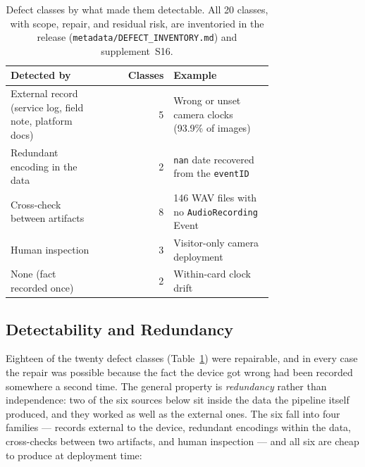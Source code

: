 \documentclass[sigconf]{acmart}
\begin{document}
\begin{table}[t]
\caption{Defect classes by what made them detectable. All 20 classes,
with scope, repair, and residual risk, are inventoried in the release
(\texttt{metadata/DEFECT\_INVENTORY.md}) and supplement~S16.}
\label{tab:defects}
\small
\begin{tabular}{p{0.36\linewidth}rp{0.38\linewidth}}
\toprule
\textbf{Detected by} & \textbf{Classes} & \textbf{Example} \\
\midrule
External record (service log, field note, platform docs) & 5 & Wrong or unset camera clocks (93.9\% of images) \\
Redundant encoding in the data & 2 & \texttt{nan} date recovered from the \texttt{eventID} \\
Cross-check between artifacts & 8 & 146 WAV files with no \texttt{AudioRecording} Event \\
Human inspection & 3 & Visitor-only camera deployment \\
\midrule
None (fact recorded once) & 2 & Within-card clock drift \\
\bottomrule
\end{tabular}
\end{table}

\subsection{Detectability and Redundancy}
\label{sec:redundancy}

Eighteen of the twenty defect classes (Table~\ref{tab:defects}) were
repairable, and in every case the repair was possible because the fact
the device got wrong had been recorded somewhere a second time. The
general property is \emph{redundancy} rather than independence: two of
the six sources below sit inside the data the pipeline itself produced,
and they worked as well as the external ones. The six fall into four
families --- records external to the device, redundant encodings within
the data, cross-checks between two artifacts, and human inspection ---
and all six are cheap to produce at deployment time:
\end{document}
